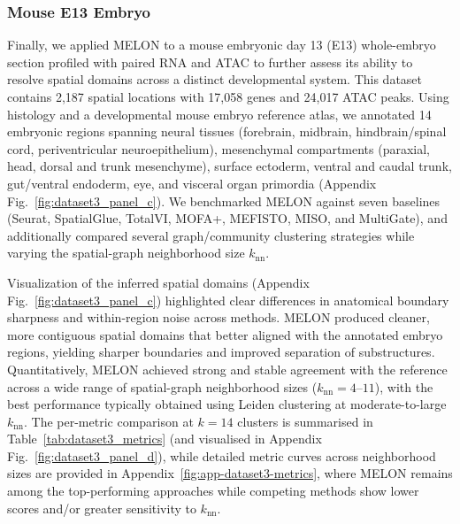 \documentclass{article}
\theoremstyle{plain}
\theoremstyle{definition}
\begin{document}
\subsubsection{Mouse E13 Embryo}
Finally, we applied MELON to a mouse embryonic day 13 (E13) whole-embryo section profiled with paired RNA and ATAC to further assess its ability to resolve spatial domains across a distinct developmental system. This dataset contains 2,187 spatial locations with 17,058 genes and 24,017 ATAC peaks. Using histology and a developmental mouse embryo reference atlas, we annotated 14 embryonic regions spanning neural tissues (forebrain, midbrain, hindbrain/spinal cord, periventricular neuroepithelium), mesenchymal compartments (paraxial, head, dorsal and trunk mesenchyme), surface ectoderm, ventral and caudal trunk, gut/ventral endoderm, eye, and visceral organ primordia (Appendix Fig.~\ref{fig:dataset3_panel_c}). We benchmarked MELON against seven baselines (Seurat, SpatialGlue, TotalVI, MOFA+, MEFISTO, MISO, and MultiGate), and additionally compared several graph/community clustering strategies while varying the spatial-graph neighborhood size $k_{\mathrm{nn}}$.

Visualization of the inferred spatial domains (Appendix Fig.~\ref{fig:dataset3_panel_c}) highlighted clear differences in anatomical boundary sharpness and within-region noise across methods. MELON produced cleaner, more contiguous spatial domains that better aligned with the annotated embryo regions, yielding sharper boundaries and improved separation of substructures. Quantitatively, MELON achieved strong and stable agreement with the reference across a wide range of spatial-graph neighborhood sizes ($k_{\mathrm{nn}}=4$--$11$), with the best performance typically obtained using Leiden clustering at moderate-to-large $k_{\mathrm{nn}}$. The per-metric comparison at $k=14$ clusters is summarised in Table~\ref{tab:dataset3_metrics} (and visualised in Appendix Fig.~\ref{fig:dataset3_panel_d}), while detailed metric curves across neighborhood sizes are provided in Appendix~\ref{fig:app-dataset3-metrics}, where MELON remains among the top-performing approaches while competing methods show lower scores and/or greater sensitivity to $k_{\mathrm{nn}}$.
\end{document}
